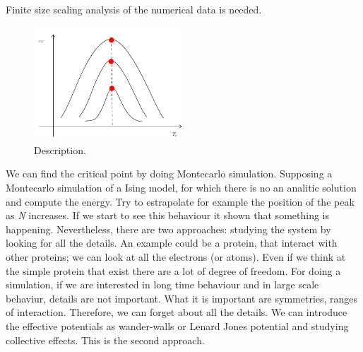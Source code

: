 \documentclass[../main/main.tex]{subfiles}
\begin{document}
Finite size scaling analysis of the numerical data is needed.

\begin{figure}[h!]
\centering
\includegraphics[width=0.5\textwidth]{../lessons/5_image/2.pdf}
\caption{\label{fig:} Description.}
\end{figure}


We can find the critical point by doing Montecarlo simulation. Supposing a Montecarlo simulation of a Ising model, for which there is no an analitic solution and compute the energy.
Try to estrapolate for example the position of the peak as \emph{N} increases. If we start to see this behaviour it shown that something is happening.
Nevertheless, there are two approaches: studying the system by looking for all the details. An example could be a protein, that interact with other proteins; we can look at all the electrons (or atoms). Even if we think at the simple protein that exist there are a lot of degree of freedom. For doing a simulation, if we are interested in long time behaviour and in large scale behaviur, details are not important. What it is important are symmetries, ranges of interaction. Therefore, we can forget about all the details. We can introduce the effective potentials as wander-walls or Lenard Jones potential and studying collective effects. This is the second approach.
\end{document}
